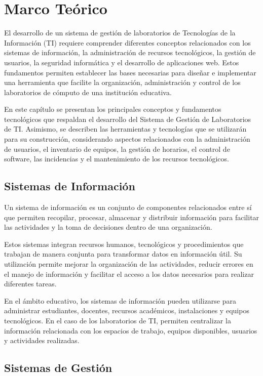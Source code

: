 
\chapter{Marco Teórico}

El desarrollo de un sistema de gestión de laboratorios de Tecnologías de la Información (TI) requiere comprender diferentes conceptos relacionados con los sistemas de información, la administración de recursos tecnológicos, la gestión de usuarios, la seguridad informática y el desarrollo de aplicaciones web. Estos fundamentos permiten establecer las bases necesarias para diseñar e implementar una herramienta que facilite la organización, administración y control de los laboratorios de cómputo de una institución educativa.

En este capítulo se presentan los principales conceptos y fundamentos tecnológicos que respaldan el desarrollo del Sistema de Gestión de Laboratorios de TI. Asimismo, se describen las herramientas y tecnologías que se utilizarán para su construcción, considerando aspectos relacionados con la administración de usuarios, el inventario de equipos, la gestión de horarios, el control de software, las incidencias y el mantenimiento de los recursos tecnológicos.

\section{Sistemas de Información}

Un sistema de información es un conjunto de componentes relacionados entre sí que permiten recopilar, procesar, almacenar y distribuir información para facilitar las actividades y la toma de decisiones dentro de una organización.

Estos sistemas integran recursos humanos, tecnológicos y procedimientos que trabajan de manera conjunta para transformar datos en información útil. Su utilización permite mejorar la organización de las actividades, reducir errores en el manejo de información y facilitar el acceso a los datos necesarios para realizar diferentes tareas.

En el ámbito educativo, los sistemas de información pueden utilizarse para administrar estudiantes, docentes, recursos académicos, instalaciones y equipos tecnológicos. En el caso de los laboratorios de TI, permiten centralizar la información relacionada con los espacios de trabajo, equipos disponibles, usuarios y actividades realizadas.

\section{Sistemas de Gestión}

